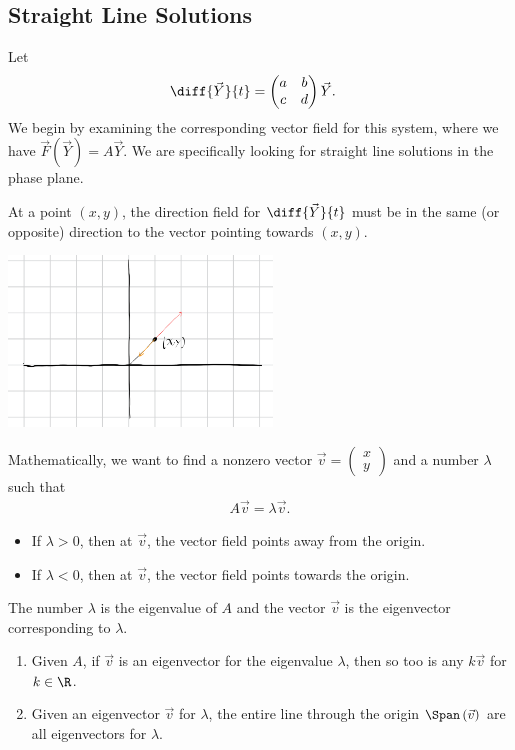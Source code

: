 \documentclass[10pt]{mypackage}
\begin{document}
\subsection{Straight Line Solutions}%
Let
\begin{align*}
  \diff{\vec{Y}}{t} &= \begin{pmatrix}a & b \\ c & d\end{pmatrix} \vec{Y}.
\end{align*}
We begin by examining the corresponding vector field for this system, where we have $\vec{F}\left(\vec{Y}\right) = A\vec{Y}$. We are specifically looking for straight line solutions in the phase plane.\newline

At a point $\left(x,y\right)$, the direction field for $\diff{\vec{Y}}{t}$ must be in the same (or opposite) direction to the vector pointing towards $\left(x,y\right)$.
\begin{center}
  \includegraphics[width=7cm]{images/straight_line_solution.png}
\end{center}
Mathematically, we want to find a nonzero vector $\vec{v} = \begin{pmatrix}x\\y\end{pmatrix}$ and a number $\lambda$ such that
\begin{align*}
  A\vec{v} = \lambda \vec{v}.
\end{align*}
\begin{itemize}
  \item If $\lambda > 0$, then at $\vec{v}$, the vector field points away from the origin.
  \item If $\lambda < 0$, then at $\vec{v}$, the vector field points towards the origin.
\end{itemize}
The number $\lambda$ is the eigenvalue of $A$ and the vector $\vec{v}$ is the eigenvector corresponding to $\lambda$.
\begin{note}\hfill
  \begin{enumerate}[(1)]
    \item Given $A$, if $\vec{v}$ is an eigenvector for the eigenvalue $\lambda$, then so too is any $k\vec{v}$ for $k\in \R$.
    \item Given an eigenvector $\vec{v}$ for $\lambda$, the entire line through the origin $\Span\left(\vec{v}\right)$ are all eigenvectors for $\lambda$.
  \end{enumerate}
\end{note}
\end{document}

